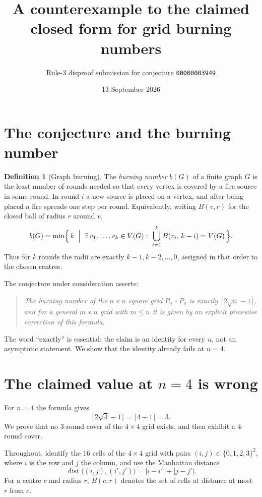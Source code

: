 \documentclass[11pt]{article}
\title{A counterexample to the claimed closed form for grid burning numbers}
\author{Rule-3 disproof submission for conjecture \texttt{00000003949}}
\date{13 September 2026}
\theoremstyle{definition}
\newtheorem{definition}[theorem]{Definition}
\theoremstyle{remark}
\DeclareMathOperator{\dist}{dist}
\begin{document}
\maketitle

\section{The conjecture and the burning number}

\begin{definition}[Graph burning]
The \emph{burning number} $b(G)$ of a finite graph $G$ is the least number of
rounds needed so that every vertex is covered by a fire source in some round.
In round $i$ a new source is placed on a vertex, and after being placed a fire
spreads one step per round.  Equivalently, writing $B(v,r)$ for the closed
ball of radius $r$ around $v$,
\begin{equation}\label{eq:burn}
  b(G) = \min\Bigl\{\, k \;\Bigm|\; \exists\, v_1,\dots,v_k \in V(G):\
  \bigcup_{i=1}^{k} B(v_i,\,k-i) = V(G) \,\Bigr\}.
\end{equation}
Thus for $k$ rounds the radii are exactly $k-1,k-2,\dots,0$, assigned in that
order to the chosen centres.
\end{definition}

The conjecture under consideration asserts:
\begin{quote}
\emph{The burning number of the $n \times n$ square grid $P_n \mathbin{\square} P_n$
is exactly $\lceil 2\sqrt{n}-1\rceil$, and for a general $m \times n$ grid with
$m \le n$ it is given by an explicit piecewise correction of this formula.}
\end{quote}

The word ``exactly'' is essential: the claim is an identity for every $n$, not
an asymptotic statement.  We show that the identity already fails at $n = 4$.

\section{The claimed value at $n=4$ is wrong}

For $n = 4$ the formula gives
\[
  \bigl\lceil 2\sqrt{4}-1 \bigr\rceil = \lceil 4-1\rceil = 3 .
\]
We prove that no $3$-round cover of the $4 \times 4$ grid exists, and then
exhibit a $4$-round cover.

Throughout, identify the $16$ cells of the $4 \times 4$ grid with pairs
$(i,j) \in \{0,1,2,3\}^2$, where $i$ is the row and $j$ the column, and use the
Manhattan distance
\[
  \dist\bigl((i,j),(i',j')\bigr) = |i-i'| + |j-j'| .
\]
For a centre $c$ and radius $r$, $B(c,r)$ denotes the set of cells at distance
at most $r$ from $c$.
\end{document}
